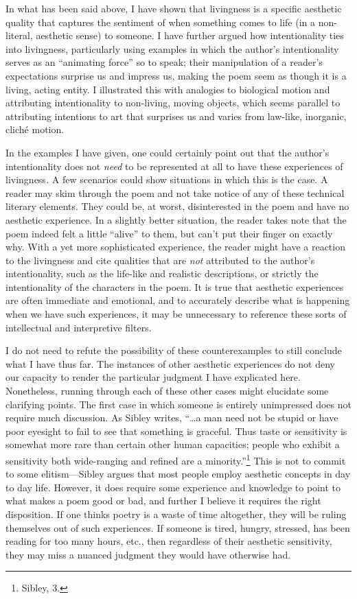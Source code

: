 In what has been said above, I have shown that livingness is a specific
aesthetic quality that captures the sentiment of when something comes to
life (in a non-literal, aesthetic sense) to someone. I have further
argued how intentionality ties into livingness, particularly using
examples in which the author's intentionality serves as an ``animating
force'' so to speak; their manipulation of a reader's expectations
surprise us and impress us, making the poem seem as though it is a
living, acting entity. I illustrated this with analogies to biological
motion and attributing intentionality to non-living, moving objects,
which seems parallel to attributing intentions to art that surprises us
and varies from law-like, inorganic, cliché motion.

In the examples I have given, one could certainly point out that the
author's intentionality does not \emph{need} to be represented at all to
have these experiences of livingness\emph{.} A few scenarios could show
situations in which this is the case. A reader may skim through the poem
and not take notice of any of these technical literary elements. They
could be, at worst, disinterested in the poem and have no aesthetic
experience. In a slightly better situation, the reader takes note that
the poem indeed felt a little ``alive'' to them, but can't put their
finger on exactly why. With a yet more sophisticated experience, the
reader might have a reaction to the livingness and cite qualities that
are \emph{not} attributed to the author's intentionality, such as the
life-like and realistic descriptions, or strictly the intentionality of
the characters in the poem. It is true that aesthetic experiences are
often immediate and emotional, and to accurately describe what is
happening when we have such experiences, it may be unnecessary to
reference these sorts of intellectual and interpretive filters.

I do not need to refute the possibility of these counterexamples to
still conclude what I have thus far. The instances of other aesthetic
experiences do not deny our capacity to render the particular judgment I
have explicated here. Nonetheless, running through each of these other
cases might elucidate some clarifying points. The first case in which
someone is entirely unimpressed does not require much discussion. As
Sibley writes, ``\dots a man need not be stupid or have poor eyesight to
fail to see that something is graceful. Thus taste or sensitivity is
somewhat more rare than certain other human capacities; people who
exhibit a sensitivity both wide-ranging and refined are a
minority.''\footnote{Sibley, 3.} This is not to commit to some elitism---Sibley argues that most people employ aesthetic concepts in day to
day life. However, it does require some experience and knowledge to
point to what makes a poem good or bad, and further I believe it
requires the right disposition. If one thinks poetry is a waste of time
altogether, they will be ruling themselves out of such experiences. If
someone is tired, hungry, stressed, has been reading for too many hours,
etc., then regardless of their aesthetic sensitivity, they may miss a
nuanced judgment they would have otherwise had.

